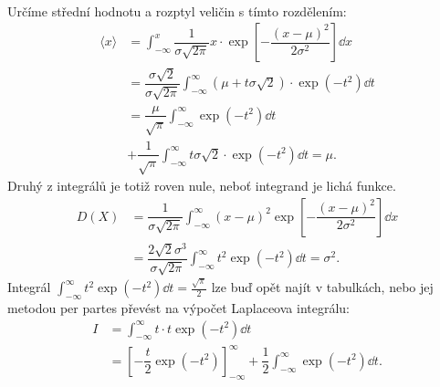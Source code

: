 \begin{mdframed}[style=mdexam]
\begin{example}
  {\centering
    \captionsetup{type=figure}
                   \\
  \par}
  \vspace*{10px} Určíme střední hodnotu a rozptyl veličin s tímto rozdělením:
  \begin{align*}
    \langle x \rangle 
      &= \int_{-\infty}^{x}\dfrac{1}{\sigma\sqrt{2\pi}}x\cdot
         \exp\left[-\dfrac{(x-\mu)^2}{2\sigma^2}\right]\dd{x}                                     \\
      &= \dfrac{\sigma\sqrt{2}}{\sigma\sqrt{2\pi}}
         \int_{-\infty}^{\infty}\left(\mu+t\sigma\sqrt{2}\right)\cdot\exp\left(-t^2\right)\dd{t}  \\
      &= \dfrac{\mu}{\sqrt{\pi}}\int_{-\infty}^{\infty}\exp\left(-t^2\right)\dd{t}                \\
      &+ \dfrac{1}{\sqrt{\pi}}\int_{-\infty}^{\infty}t\sigma\sqrt{2}\cdot\exp\left(-t^2\right)\dd{t}
       =\mu.
  \end{align*}
  Druhý z integrálů je totiž roven nule, neboť integrand je lichá funkce.
  \begin{align*}
    D(X)  &= \dfrac{1}{\sigma\sqrt{2\pi}}\int_{-\infty}^{\infty}\left(x - \mu\right)^2 
             \exp\left[-\dfrac{(x-\mu)^2}{2\sigma^2}\right]\dd{x}                                \\
          &= \dfrac{2\sqrt{2}\sigma^3}{\sigma\sqrt{2\pi}}
             \int_{-\infty}^{\infty}t^2\exp\left(-t^2\right)\dd{t}
           = \sigma^2.
  \end{align*}
  Integrál \(\int_{-\infty}^{\infty}t^2\exp\left(-t^2\right)\dd{t} = \frac{\sqrt{\pi}}{2}\) lze buď 
  opět najít v tabulkách, nebo jej metodou per partes převést na výpočet Laplaceova integrálu:
  \begin{align*}
    I &= \int_{-\infty}^{\infty}t\cdot t\exp\left(-t^2\right)\dd{t}         \\
      &= \left[-\dfrac{t}{2}\exp\left(-t^2\right)\right]_{-\infty}^{\infty}
       + \dfrac{1}{2}\int_{-\infty}^{\infty}\exp\left(-t^2\right)\dd{t}.
  \end{align*}
  

\end{example}
\end{mdframed}
